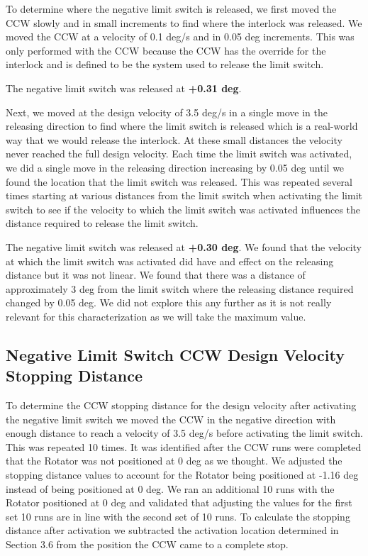 \documentclass[SE,lsstdraft,authoryear,toc]{lsstdoc}
\begin{document}
To determine where the negative limit switch is released, we first moved
the CCW slowly and in small increments to find where the interlock was
released. We moved the CCW at a velocity of 0.1 deg/s and in 0.05 deg
increments. This was only performed with the CCW because the CCW has the
override for the interlock and is defined to be the system used to
release the limit switch.

The negative limit switch was released at \textbf{+0.31 deg}.

Next, we moved at the design velocity of 3.5 deg/s in a single move in
the releasing direction to find where the limit switch is released which
is a real-world way that we would release the interlock. At these small
distances the velocity never reached the full design velocity. Each time
the limit switch was activated, we did a single move in the releasing
direction increasing by 0.05 deg until we found the location that the
limit switch was released. This was repeated several times starting at
various distances from the limit switch when activating the limit switch
to see if the velocity to which the limit switch was activated
influences the distance required to release the limit switch.

The negative limit switch was released at \textbf{+0.30 deg}. We found
that the velocity at which the limit switch was activated did have and
effect on the releasing distance but it was not linear. We found that
there was a distance of approximately 3 deg from the limit switch where
the releasing distance required changed by 0.05 deg. We did not explore
this any further as it is not really relevant for this characterization
as we will take the maximum value.

\hypertarget{negative-limit-switch-ccw-design-velocity-stopping-distance}{%
\subsection{Negative Limit Switch CCW Design Velocity Stopping
Distance}\label{negative-limit-switch-ccw-design-velocity-stopping-distance}}

To determine the CCW stopping distance for the design velocity after
activating the negative limit switch we moved the CCW in the negative
direction with enough distance to reach a velocity of 3.5 deg/s before
activating the limit switch. This was repeated 10 times. It was
identified after the CCW runs were completed that the Rotator was not
positioned at 0 deg as we thought. We adjusted the stopping distance
values to account for the Rotator being positioned at -1.16 deg instead
of being positioned at 0 deg. We ran an additional 10 runs with the
Rotator positioned at 0 deg and validated that adjusting the values for
the first set 10 runs are in line with the second set of 10 runs. To
calculate the stopping distance after activation we subtracted the
activation location determined in Section 3.6 from the position the CCW
came to a complete stop.
\end{document}
